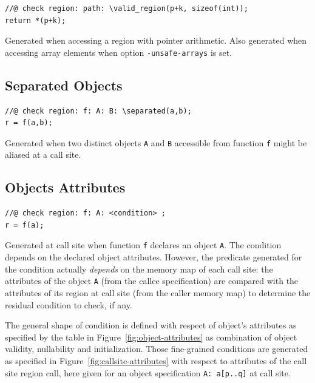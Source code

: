 \begin{lstlisting}
//@ check region: path: \valid_region(p+k, sizeof(int));
return *(p+k);
\end{lstlisting}

\noindent
Generated when accessing a region with pointer arithmetic. Also generated when
accessing array elements when option \verb+-unsafe-arrays+ is set.

\subsection{Separated Objects}

\begin{lstlisting}
//@ check region: f: A: B: \separated(a,b);
r = f(a,b);
\end{lstlisting}

\noindent
Generated when two distinct objects \verb+A+ and \verb+B+ accessible from function
\verb+f+ might be aliased at a call site.

\subsection{Objects Attributes}

\begin{lstlisting}
//@ check region: f: A: <condition> ;
r = f(a);
\end{lstlisting}

\noindent
Generated at call site when function \verb+f+ declares an object \verb+A+. The
condition depends on the declared object attributes. However, the predicate
generated for the condition actually \emph{depends} on the memory map of each
call site: the attributes of the object \verb+A+ (from the callee specification)
are compared with the attributes of its region at call site (from the caller
memory map) to determine the residual condition to check, if any.

The general shape of condition is defined with respect of object's attributes as
specified by the table in Figure~\ref{fig:object-attributes} as combination of
object validity, nullability and initialization. Those fine-grained conditions
are generated as specified in Figure~\ref{fig:callsite-attributes} with respect
to attributes of the call site region call, here given for an object
specification \verb+A: a[p..q]+ at call site.


